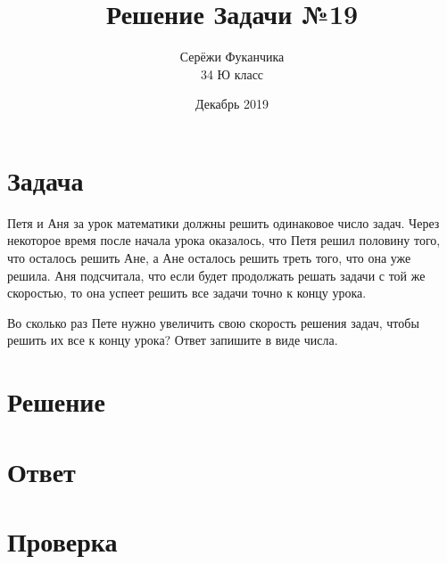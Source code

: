 \documentclass{article}
\title{Решение Задачи №19}
\author{Серёжи Фуканчика\\34 Ю класс}
\date{Декабрь 2019}
\begin{document}
\maketitle

\section{Задача}
Петя и Аня за урок математики должны решить одинаковое число задач. Через некоторое время после начала урока оказалось, что Петя решил половину того, что осталось решить Ане, а Ане осталось решить треть того, что она уже решила. Аня подсчитала, что если будет продолжать решать задачи с той же скоростью, то она успеет решить все задачи точно к концу урока.

Во сколько раз Пете нужно увеличить свою скорость решения задач, чтобы решить их все к концу урока? Ответ запишите в виде числа.

\section{Решение}

\section{Ответ}

\section{Проверка}
\end{document}
